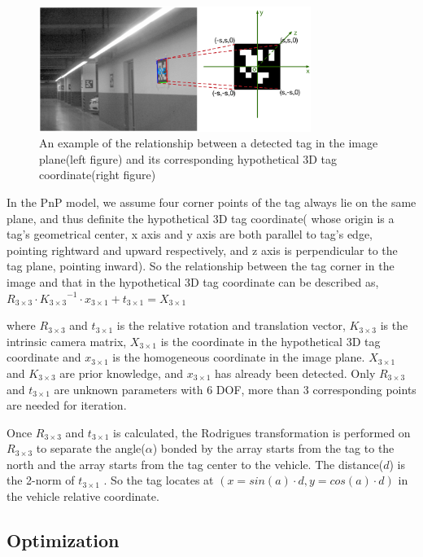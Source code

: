 \documentclass[journal]{IEEEtran}
\begin{document}
\begin{figure}
\centering
\includegraphics[height = 1.6in]{fig7_Visual_markers}
\caption{
An example of the relationship between a detected tag in the image plane(left figure) and its corresponding hypothetical 3D tag coordinate(right figure)
}\label{fig:7}
\end{figure}

In the PnP model, we assume four corner points of the tag always lie on the same plane, and thus definite the hypothetical 3D tag coordinate( whose origin is a tag’s geometrical center, x axis and y axis are both parallel to tag’s edge, pointing rightward and upward respectively, and z axis is perpendicular to the tag plane, pointing inward). So the relationship between the tag corner in the image and that in the hypothetical 3D tag coordinate can be described as,
${R}_{3 \times 3} \cdot {{K}_{3 \times 3}}^{-1} \cdot {x}_{3 \times 1}+{t}_{3 \times 1}={X}_{3 \times 1}$

where ${R}_{3 \times 3}$ and ${t}_{3 \times 1}$ is the relative rotation and translation vector, ${K}_{3 \times 3}$ is the intrinsic camera matrix, ${X}_{3 \times 1}$ is the coordinate in the hypothetical 3D tag coordinate and ${x}_{3 \times 1}$ is the homogeneous coordinate in the image plane. ${X}_{3 \times 1}$ and ${K}_{3 \times 3}$ are prior knowledge, and ${x}_{3 \times 1}$ has already been detected. Only ${R}_{3 \times 3}$ and ${t}_{3 \times 1}$ are unknown parameters with 6 DOF, more than 3 corresponding points are needed for iteration. 

Once ${R}_{3 \times 3}$ and ${t}_{3 \times 1}$ is calculated, the Rodrigues transformation is performed on ${R}_{3 \times 3}$ to separate the angle($\alpha$) bonded by the array starts from the tag to the north and the array starts from the tag center to the vehicle. The distance($d$) is the 2-norm of ${t}_{3 \times 1}$ . So the tag locates at $( x=sin(a) \cdot d, y=cos(a) \cdot d)$ in the vehicle relative coordinate.

\subsection{Optimization}
\end{document}
